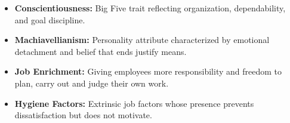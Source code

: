 \documentclass[12pt,a4paper]{article}
\begin{document}
\begin{tcolorbox}[defbox, title={\textbf{One-Line Definitions for Exam Revision}}]
  \begin{itemize}[leftmargin=*, itemsep=2pt]
    \item \textbf{Conscientiousness:} Big Five trait reflecting organization, dependability, and goal discipline.
    \item \textbf{Machiavellianism:} Personality attribute characterized by emotional detachment and belief that ends justify means.
    \item \textbf{Job Enrichment:} Giving employees more responsibility and freedom to plan, carry out and judge their own work.
    \item \textbf{Hygiene Factors:} Extrinsic job factors whose presence prevents dissatisfaction but does not motivate.
  \end{itemize}
\end{tcolorbox}
\end{document}
